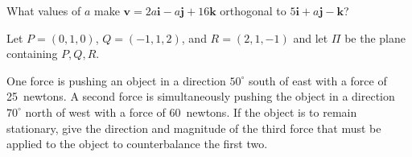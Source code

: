 \documentclass[answers,addpoints]{exam}
\begin{document}
\begin{questions}

\question[12] What values of $a$ make
$\mathbold{v}=2a\mathbold{i}-a\mathbold{j}+16\mathbold{k}$
orthogonal to $5\mathbold{i}+a\mathbold{j}-\mathbold{k}$?

\question[20]
Let $P=\left(0,1,0\right)$, $Q=\left(-1,1,2\right)$,
and $R=\left(2,1,-1\right)$ and let $\Pi$ be the plane
containing $P,Q,R$.

\question[20] One force is pushing an object in a direction
$50^\circ$ south of east with a force of 25~newtons.
A second force is simultaneously pushing the object
in a direction $70^\circ$ north of west with a force of
60~newtons. If the object is to remain stationary,
give the direction and magnitude of the third force that must
be applied to the object to counterbalance
the first two.


\end{questions}
\end{document}
